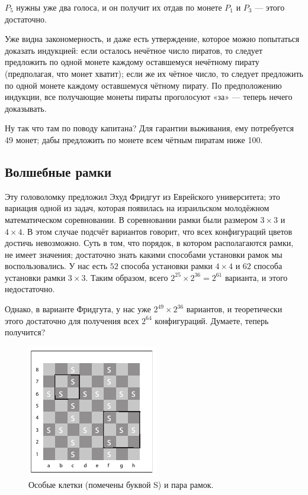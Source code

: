 $P_5$ нужны уже два голоса, и он получит их отдав по монете $P_1$ и $P_3$ --- этого достаточно.

Уже видна закономерность, и даже есть утверждение, которое можно попытаться доказать индукцией:
если осталось нечётное число пиратов, то следует предложить по одной монете каждому оставшемуся нечётному пирату (предполагая, что монет хватит);
если же их чётное число, то следует предложить по одной монете каждому оставшемуся чётному пирату.
По предположению индукции, все получающие монеты пираты проголосуют «за» --- теперь нечего доказывать.

Ну так что там по поводу капитана?
Для гарантии выживания, ему потребуется 49 монет; дабы предложить по монете всем чётным пиратам ниже 100.

\subsection*{Волшебные рамки}

Эту головоломку предложил Эхуд Фридгут из Еврейского университета; это вариация одной из задач, которая появилась на израильском молодёжном математическом соревновании.
В соревновании рамки были размером $3 \times 3$ и $4 \times 4$.
В этом случае подсчёт вариантов говорит, что всех конфигураций цветов достичь невозможно.
Суть в том, что порядок, в котором располагаются рамки, не имеет значения;
достаточно знать какими способами установки рамок мы воспользовались.
У нас есть $52$ способа установки рамки $4 \times 4$
и $62$ способа установки рамки $3 \times 3$.
Таким образом, всего $2^{25} \times 2^{36} = 2^{61}$ варианта, и этого недостаточно.

Однако, в варианте Фридгута, у нас уже $2^{49} \times 2^{36}$ вариантов, и теоретически этого достаточно для получения всех $2^{64}$ конфигураций.
Думаете, теперь получится?

\begin{figure}[ht!]
\centering
\includegraphics[scale=1]{pics/chess}
\caption{Особые клетки (помечены буквой S) и пара рамок.}
\label{pic:chess1}
\end{figure}

